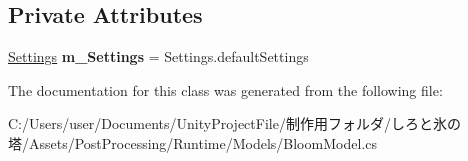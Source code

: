 \subsection*{Private Attributes}
\begin{DoxyCompactItemize}
\item 
\mbox{\label{class_unity_engine_1_1_post_processing_1_1_bloom_model_a36ac00b4d861726347832183d398324e}} 
\hyperlink{struct_unity_engine_1_1_post_processing_1_1_bloom_model_1_1_settings}{Settings} {\bfseries m\+\_\+\+Settings} = Settings.\+default\+Settings
\end{DoxyCompactItemize}


The documentation for this class was generated from the following file\+:\begin{DoxyCompactItemize}
\item 
C\+:/\+Users/user/\+Documents/\+Unity\+Project\+File/制作用フォルダ/しろと氷の塔/\+Assets/\+Post\+Processing/\+Runtime/\+Models/Bloom\+Model.\+cs\end{DoxyCompactItemize}
